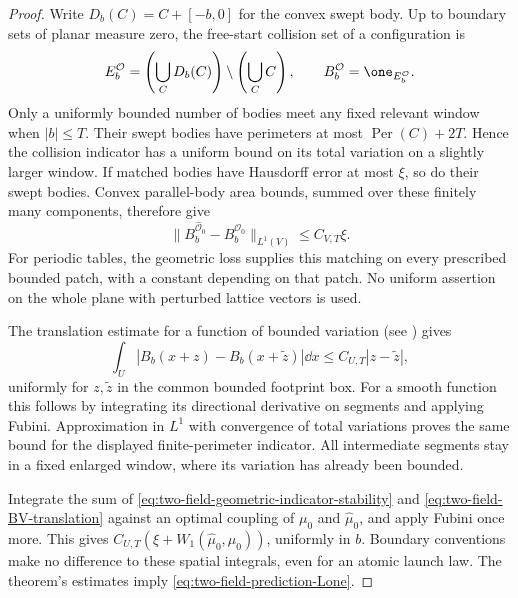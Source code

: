 \begin{proof}
Write $D_b(C)=C+[-b,0]$ for the convex swept body.  Up to boundary
sets of planar measure zero, the free-start collision set of a
configuration is
\[
 E_b^{\mathcal O}
   =\left(\bigcup_C D_b(C)\right)\setminus\left(\bigcup_C C\right),
                         \qquad B_b^{\mathcal O}=\one_{E_b^{\mathcal O}}.
\]
Only a uniformly bounded number of bodies meet any fixed relevant
window when $|b|\le T$.  Their swept bodies have perimeters at most
$\operatorname{Per}(C)+2T$.  Hence the collision indicator has a
uniform bound on its total variation on a slightly larger window.
If matched bodies have Hausdorff error at most $\xi$, so do their
swept bodies.  Convex parallel-body area bounds, summed over these
finitely many components, therefore give
\begin{equation}\label{eq:two-field-geometric-indicator-stability}
 \|B_b^{\widehat{\mathcal O}_0}-B_b^{\mathcal O_0}\|_{L^1(V)}
                               \le C_{V,T}\xi.
\end{equation}
For periodic tables, the geometric loss supplies this matching on
every prescribed bounded patch, with a constant depending on that
patch.  No uniform assertion on the whole plane with perturbed
lattice vectors is used.

The translation estimate for a function of bounded variation
(see \cite[Chapter~3]{AFP}) gives
\begin{equation}\label{eq:two-field-BV-translation}
 \int_U |B_b(x+z)-B_b(x+\widetilde z)|\dd x
                              \le C_{U,T}|z-\widetilde z|,
\end{equation}
uniformly for $z,\widetilde z$ in the common bounded footprint box.
For a smooth function this follows by integrating its directional
derivative on segments and applying Fubini.  Approximation in
$L^1$ with convergence of total variations proves the same bound
for the displayed finite-perimeter indicator.  All intermediate
segments stay in a fixed enlarged window, where its variation has
already been bounded.

Integrate the sum of
\eqref{eq:two-field-geometric-indicator-stability} and
\eqref{eq:two-field-BV-translation} against an optimal coupling of
$\mu_0$ and $\widehat\mu_0$, and apply Fubini once more.  This gives
$C_{U,T}(\xi+W_1(\widehat\mu_0,\mu_0))$, uniformly in $b$.
Boundary conventions make no difference to these spatial integrals,
even for an atomic launch law.  The theorem's estimates imply
\eqref{eq:two-field-prediction-Lone}.
\end{proof}

